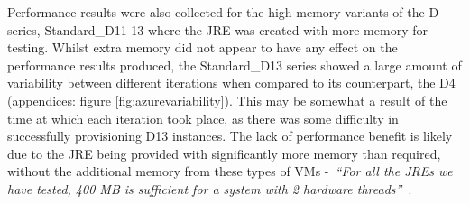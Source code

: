 \documentclass{llncs}
\begin{document}
Performance results were also collected for the high memory variants of the D-series, Standard\_D11-13 where the JRE was created with more memory for testing. Whilst extra memory did not appear to have any effect on the performance results produced, the Standard\_D13 series showed a large amount of variability between different iterations when compared to its counterpart, the D4 (appendices: figure \ref{fig:azurevariability}). This may be somewhat a result of the time at which each iteration took place, as there was some difficulty in successfully provisioning D13 instances. The lack of performance benefit is likely due to the JRE being provided with significantly more memory than required, without the additional memory from these types of VMs -~\emph{``For all the JREs we have tested, 400 MB is sufficient for a system with 2 hardware threads''}~\cite{specjvmguide}.
\end{document}
